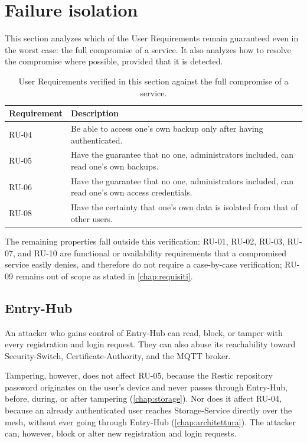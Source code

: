 \section{Failure isolation}

This section analyzes which of the User Requirements remain guaranteed even in the worst case: the
full compromise of a service.
It also analyzes how to resolve the compromise where possible, provided that it is detected.

\begin{table}[H]
\centering
\caption{User Requirements verified in this section against the full compromise of a service.}
\label{tab:ru-isolamento-fallimenti}
\begin{tabular}{@{}l p{}@{}}
\hline
\textbf{Requirement} & \textbf{Description} \\
\hline
RU-04 & Be able to access one's own backup only after having authenticated. \\
RU-05 & Have the guarantee that no one, administrators included, can read one's own backups. \\
RU-06 & Have the guarantee that no one, administrators included, can read one's own
access credentials. \\
RU-08 & Have the certainty that one's own data is isolated from that of other users. \\
\hline
\end{tabular}
\end{table}

The remaining properties fall outside this verification: RU-01, RU-02, RU-03, RU-07, and RU-10 are functional
or availability requirements that a compromised service easily denies, and therefore do not require
a case-by-case verification; RU-09 remains out of scope as stated in \autoref{chap:requisiti}.

\subsection{Entry-Hub}

An attacker who gains control of Entry-Hub can read, block, or tamper with every registration and login
request. They can also abuse its reachability toward Security-Switch,
Certificate-Authority, and the MQTT broker.

Tampering, however, does not affect RU-05, because the Restic repository password originates on the user's
device and never passes through Entry-Hub, before, during, or after tampering (\autoref{chap:storage}).
Nor does it affect RU-04, because an already authenticated user reaches Storage-Service directly over the
mesh, without ever going through Entry-Hub (\autoref{chap:architettura}).
The attacker can, however, block or alter new registration and login requests.

